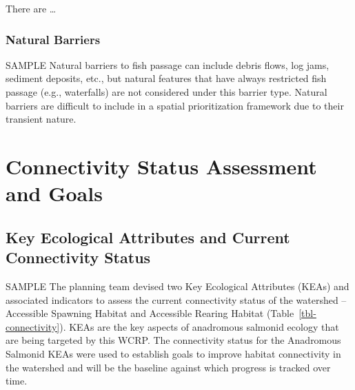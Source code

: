 \documentclass[
  letterpaper,
  DIV=11,
  numbers=noendperiod]{scrreprt}
\begin{document}
There are \ldots{}

\subsection*{Natural Barriers}\label{natural-barriers}

SAMPLE Natural barriers to fish passage can include debris flows, log
jams, sediment deposits, etc., but natural features that have always
restricted fish passage (e.g., waterfalls) are not considered under this
barrier type. Natural barriers are difficult to include in a spatial
prioritization framework due to their transient nature.


\chapter*{Connectivity Status Assessment and
Goals}\label{connectivity-status-assessment-and-goals}


\section*{Key Ecological Attributes and Current Connectivity
Status}\label{key-ecological-attributes-and-current-connectivity-status}


SAMPLE The planning team devised two Key Ecological Attributes (KEAs)
and associated indicators to assess the current connectivity status of
the watershed -- Accessible Spawning Habitat and Accessible Rearing
Habitat (Table~\ref{tbl-connectivity}). KEAs are the key aspects of
anadromous salmonid ecology that are being targeted by this WCRP. The
connectivity status for the Anadromous Salmonid KEAs were used to
establish goals to improve habitat connectivity in the watershed and
will be the baseline against which progress is tracked over time.
\end{document}
